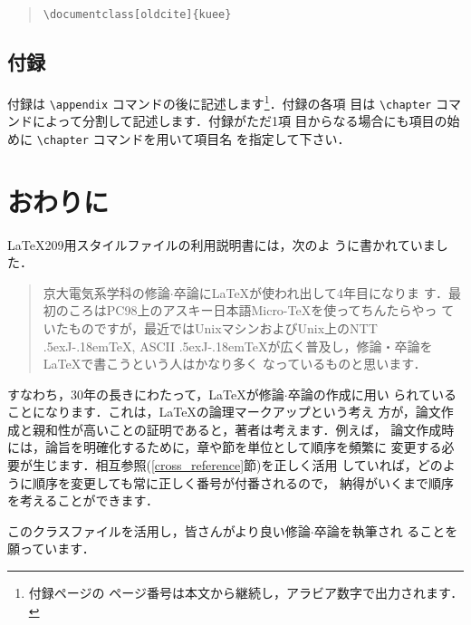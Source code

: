 \documentclass[sotsuron]{kuee}
\def\JTeX{\leavevmode\lower.5ex\hbox{J}\kern-.18em\TeX}
\begin{document}
\begin{quote}
\begin{verbatim}
\documentclass[oldcite]{kuee}
\end{verbatim}
\end{quote}

\section{付録}

付録は \verb+\appendix+ コマンドの後に記述します\footnote{付録ページの
ページ番号は本文から継続し，アラビア数字で出力されます．}．付録の各項
目は \verb+\chapter+ コマンドによって分割して記述します．付録がただ1項
目からなる場合にも項目の始めに \verb+\chapter+ コマンドを用いて項目名
を指定して下さい．


\chapter{おわりに}
\label{chap:conclusion}

\LaTeX{}209用スタイルファイルの利用説明書\cite{OldTebiki}には，次のよ
うに書かれていました．
\begin{quote}
  京大電気系学科の修論$\cdot$卒論に\LaTeX が使われ出して4年目になりま
  す．最初のころはPC98上のアスキー日本語Micro-\TeX を使ってちんたらやっ
  ていたものですが，最近ではUnixマシンおよびUnix上のNTT \JTeX, ASCII
  \JTeX が広く普及し，修論・卒論を\LaTeX で書こうという人はかなり多く
  なっているものと思います．
\end{quote}
すなわち，30年の長きにわたって，\LaTeX{}が修論$\cdot$卒論の作成に用い
られていることになります．これは，\LaTeX{}の論理マークアップという考え
方が，論文作成と親和性が高いことの証明であると，著者は考えます．例えば，
論文作成時には，論旨を明確化するために，章や節を単位として順序を頻繁に
変更する必要が生じます．相互参照(\ref{cross_reference}節)を正しく活用
していれば，どのように順序を変更しても常に正しく番号が付番されるので，
納得がいくまで順序を考えることができます．

このクラスファイルを活用し，皆さんがより良い修論$\cdot$卒論を執筆され
ることを願っています．
\end{document}
